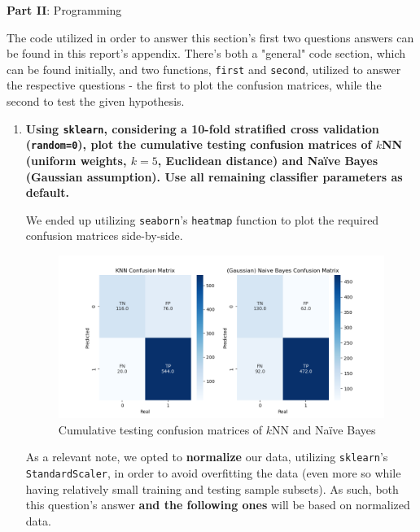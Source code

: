 \documentclass[12pt]{article}
\begin{document}
\pagebreak

\center\large{\textbf{Part II}: Programming}

The code utilized in order to answer this section's first two questions answers
can be found in this report's appendix. There's both a "general" code section,
which can be found initially, and two functions, \texttt{first} and \texttt{second},
utilized to answer the respective questions - the first to plot the confusion matrices,
while the second to test the given hypothesis.

\begin{enumerate}[leftmargin=\labelsep,resume]
  \item \textbf{Using \texttt{sklearn}, considering a 10-fold stratified cross validation (\texttt{random=0}), plot the cumulative
          testing confusion matrices of $k$NN (uniform weights, $k = 5$, Euclidean distance) and Naïve Bayes
          (Gaussian assumption). Use all remaining classifier parameters as default.}

        We ended up utilizing \texttt{seaborn}'s \texttt{heatmap} function to plot the
        required confusion matrices side-by-side.

        \begin{figure}[h]
          \centering
          \includegraphics[width=1.1\textwidth]{../assets/hw2-2.1.png}
          \caption{Cumulative testing confusion matrices of $k$NN and Naïve Bayes}
          \label{fig:fig1}
        \end{figure}

        As a relevant note, we opted to \textbf{normalize} our data, utilizing \texttt{sklearn}'s
        \texttt{StandardScaler}, in order to avoid overfitting the data (even more so while
        having relatively small training and testing sample subsets). As such, both this
        question's answer \textbf{and the following ones} will be based on normalized data.


\end{enumerate}
\end{document}

